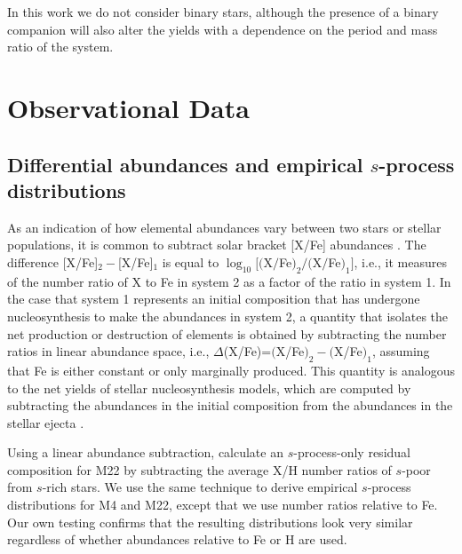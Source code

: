 In this work we do not consider binary stars, although the presence of a binary companion will also alter the yields with a dependence on the period and mass ratio of the system. 

\section{Observational Data}
\subsection{Differential abundances and empirical $s$-process distributions}
As an indication of how elemental abundances vary between two stars or stellar populations, it is common to subtract solar bracket [X/Fe] abundances \citep[e.g.,][]{Yong:2008in,Roederer:2011hw}. The difference [X/Fe]$_2 - $[X/Fe]$_1$ is equal to $\log_{10} [($X$/$Fe$)_2/($X$/$Fe$)_1]$, i.e., it measures of the number ratio of X to Fe in system 2 as a factor of the ratio in system 1. In the case that system 1 represents an initial composition that has undergone nucleosynthesis to make the abundances in system 2, a quantity that isolates the net production or destruction of elements is obtained by subtracting the number ratios in linear abundance space, i.e., $\Delta$(X/Fe)=$($X/Fe$)_2 - ($X/Fe$)_1$, assuming that Fe is either constant or only marginally produced. This quantity is analogous to the net yields of stellar nucleosynthesis models, which are computed by subtracting the abundances in the initial composition from the abundances in the stellar ejecta \citep[e.g.,][]{Karakas:2010et}.

Using a linear abundance subtraction, \citet[][Table 8]{Roederer:2011hw} calculate an $s$-process-only residual composition for M22 by subtracting the average X/H number ratios of $s$-poor from $s$-rich stars. We use the same technique to derive empirical $s$-process distributions for M4 and M22, except that we use number ratios relative to Fe. Our own testing confirms that the resulting distributions look very similar regardless of whether abundances relative to Fe or H are used.

